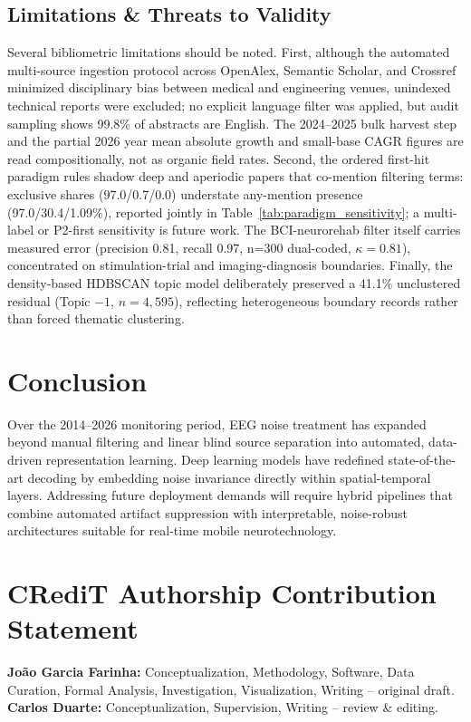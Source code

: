 \documentclass[preprint,12pt]{elsarticle}
\begin{document}
\subsection{Limitations \& Threats to Validity}
Several bibliometric limitations should be noted. First, although the automated multi-source ingestion protocol across OpenAlex, Semantic Scholar, and Crossref minimized disciplinary bias between medical and engineering venues, unindexed technical reports were excluded; no explicit language filter was applied, but audit sampling shows 99.8\% of abstracts are English. The 2024--2025 bulk harvest step and the partial 2026 year mean absolute growth and small-base CAGR figures are read compositionally, not as organic field rates. Second, the ordered first-hit paradigm rules shadow deep and aperiodic papers that co-mention filtering terms: exclusive shares (97.0/0.7/0.0) understate any-mention presence (97.0/30.4/1.09\%), reported jointly in Table~\ref{tab:paradigm_sensitivity}; a multi-label or P2-first sensitivity is future work. The BCI-neurorehab filter itself carries measured error (precision 0.81, recall 0.97, n=300 dual-coded, $\kappa = 0.81$), concentrated on stimulation-trial and imaging-diagnosis boundaries. Finally, the density-based HDBSCAN topic model deliberately preserved a 41.1\% unclustered residual (Topic $-1$, $n=4{,}595$), reflecting heterogeneous boundary records rather than forced thematic clustering.

\section{Conclusion}
\label{sec:conclusion}
Over the 2014--2026 monitoring period, EEG noise treatment has expanded beyond manual filtering and linear blind source separation into automated, data-driven representation learning. Deep learning models have redefined state-of-the-art decoding by embedding noise invariance directly within spatial-temporal layers. Addressing future deployment demands will require hybrid pipelines that combine automated artifact suppression with interpretable, noise-robust architectures suitable for real-time mobile neurotechnology.

\section*{CRediT Authorship Contribution Statement}
\textbf{João Garcia Farinha:} Conceptualization, Methodology, Software, Data Curation, Formal Analysis, Investigation, Visualization, Writing -- original draft. \textbf{Carlos Duarte:} Conceptualization, Supervision, Writing -- review \& editing.
\end{document}
